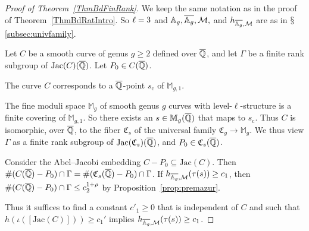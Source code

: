 \begin{proof}[Proof of Theorem~\ref{ThmBdFinRank}] 
  We keep the same notation as in the proof of
  Theorem~\ref{ThmBdRatIntro}. So $\ell = 3$ and
  $\mathbb{A}_g,\overline{\mathbb{A}_g},{\mathcal M},$ and
  $h_{\overline{\mathbb{A}_g},{\mathcal M}}$
  are as in $\mathsection$\ref{subsec:univfamily}.

  Let $C$ be a smooth curve of genus $g\ge 2$ defined over ${\overline{\mathbb{Q}}}$,
  and let $\Gamma$ be a finite rank subgroup of
  $\mathrm{Jac}(C)({\overline{\mathbb{Q}}})$. Let $P_0 \in C({\overline{\mathbb{Q}}})$.
  
  The curve $C$
  corresponds to a ${\overline{\mathbb{Q}}}$-point $s_{\mathrm{c}}$ of
  $\mathbb{M}_{g,1}$.%
  
  
  The fine moduli space $\mathbb{M}_g$ of smooth genus $g$ curves
  with level-$\ell$-structure is a finite covering of $\mathbb{M}_{g,1}$. So there exists an $s \in \mathbb{M}_g({\overline{\mathbb{Q}}})$ 
  that maps to $s_{\mathrm{c}}$. Thus $C$ is isomorphic, over ${\overline{\mathbb{Q}}}$, to the fiber $\mathfrak{C}_s$ of the universal family 
  $\mathfrak{C}_g\rightarrow\mathbb{M}_g$. We thus view $\Gamma$ as a
  finite rank subgroup of $\mathrm{Jac}(\mathfrak{C}_s)({\overline{\mathbb{Q}}})$, and
  $P_0 \in \mathfrak{C}_s({\overline{\mathbb{Q}}})$. 
  
  Consider the Abel--Jacobi embedding $C-P_0 \subseteq
  \mathrm{Jac}(C)$. Then $\# (C({\overline{\mathbb{Q}}})-P_0) \cap \Gamma = \#
  (\mathfrak{C}_s({\overline{\mathbb{Q}}}) - P_0)\cap \Gamma$. If $h_{\overline{\mathbb{A}_g},{\mathcal M}}(\tau(s)) \ge c_1$, then $\# (C({\overline{\mathbb{Q}}})-P_0) \cap \Gamma \le c_2^{1+\rho}$ 
  by Proposition~\ref{prop:premazur}. %

  Thus it suffices to find a constant $c'_1\ge 0$ that is independent
  of $C$ and such %
  that $h(\iota([\mathrm{Jac}(C)])) \ge c_1'$ implies
  $h_{\overline{\mathbb{A}_g},{\mathcal M}}(\tau(s)) \ge c_1$. 
  

\end{proof}
